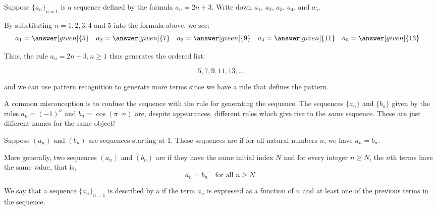 \documentclass{ximera}
\begin{document}
\begin{example}
Suppose $\{a_n\}_{n=1}$ is a sequence defined by the formula $a_n = 2n+3$.  Write down $a_1$, $a_2$, $a_3$, $a_4$, and $a_5$.

  \begin{explanation}
    By substituting $n=1, 2, 3, 4$ and $5$ into the formula above, we see:
    \begin{align*}
      a_1 &= \answer[given]{5} & 
      a_2 &= \answer[given]{7} & 
      a_3 &= \answer[given]{9} & 
      a_4 &= \answer[given]{11} & 
      a_5 &= \answer[given]{13} 
    \end{align*}
    
Thus, the rule $a_n = 2n+3, n \geq 1$ thus generates the ordered list:

\[
5,7,9,11,13, \dots
\]   

and we can use pattern recognition to generate more terms since we have a rule that defines the pattern.
  \end{explanation}
  
\end{example}

\begin{warning}
  A common misconception is to confuse the sequence with the rule for
  generating the sequence.  The sequences $\{a_n\}$ and $\{b_n\}$ given by
  the rules $a_n = (-1)^n$ and $b_n = \cos (\pi \cdot n)$ are, despite
  appearances, different rules which give rise to the \textit{same}
  sequence.  These are just different names for the same object!
\end{warning}


\begin{definition}
  Suppose $(a_n)$ and $(b_n)$ are sequences starting at $1$.  These
  sequences are  if for all
  natural numbers $n$, we have $a_n = b_n$.

  More generally, two sequences $(a_n)$ and $(b_n)$ are
   if they have the same initial index $N$  and for
  every integer $n \geq N$, the $n$th terms have the same value, that is,
  \[
  a_n = b_n \quad \text{for all $n \geq N$.}
  \]
\end{definition}

\begin{definition}
We say that a sequence $\{a_n\}_{n=1}$ is described by a  if the term $a_n$ is expressed as a function of $n$ and at least one of the previous terms in the sequence.
\end{definition}
\end{document}
